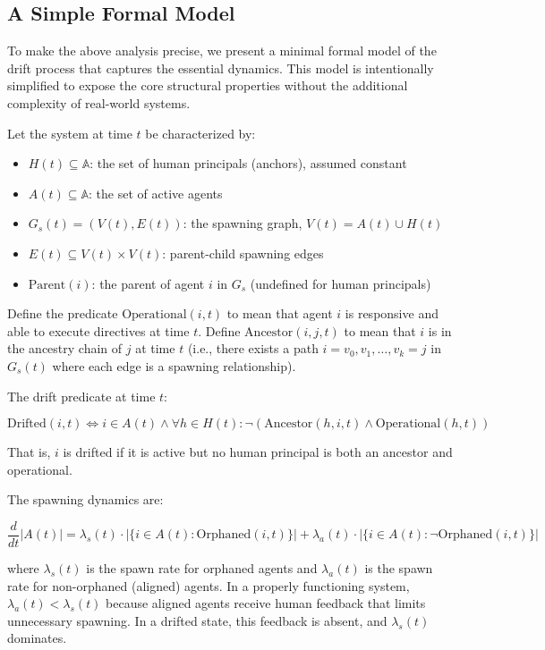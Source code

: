 \subsection{A Simple Formal Model}

To make the above analysis precise, we present a minimal formal model of the drift process that captures the essential dynamics. This model is intentionally simplified to expose the core structural properties without the additional complexity of real-world systems.

Let the system at time $t$ be characterized by:

\begin{itemize}
    \item $H(t) \subseteq \mathbb{A}$: the set of human principals (anchors), assumed constant
    \item $A(t) \subseteq \mathbb{A}$: the set of active agents
    \item $G_s(t) = (V(t), E(t))$: the spawning graph, $V(t) = A(t) \cup H(t)$
    \item $E(t) \subseteq V(t) \times V(t)$: parent-child spawning edges
    \item $\text{Parent}(i)$: the parent of agent $i$ in $G_s$ (undefined for human principals)
\end{itemize}

Define the predicate $\text{Operational}(i, t)$ to mean that agent $i$ is responsive and able to execute directives at time $t$. Define $\text{Ancestor}(i, j, t)$ to mean that $i$ is in the ancestry chain of $j$ at time $t$ (i.e., there exists a path $i = v_0, v_1, \ldots, v_k = j$ in $G_s(t)$ where each edge is a spawning relationship).

The drift predicate at time $t$:

\[
\text{Drifted}(i, t) \iff i \in A(t) \land \forall h \in H(t) : \neg(\text{Ancestor}(h, i, t) \land \text{Operational}(h, t))
\]

That is, $i$ is drifted if it is active but no human principal is both an ancestor and operational.

The spawning dynamics are:

\[
\frac{d}{dt}|A(t)| = \lambda_s(t) \cdot |\{ i \in A(t) : \text{Orphaned}(i, t) \}| + \lambda_a(t) \cdot |\{ i \in A(t) : \neg\text{Orphaned}(i, t) \}|
\]

where $\lambda_s(t)$ is the spawn rate for orphaned agents and $\lambda_a(t)$ is the spawn rate for non-orphaned (aligned) agents. In a properly functioning system, $\lambda_a(t) < \lambda_s(t)$ because aligned agents receive human feedback that limits unnecessary spawning. In a drifted state, this feedback is absent, and $\lambda_s(t)$ dominates.

